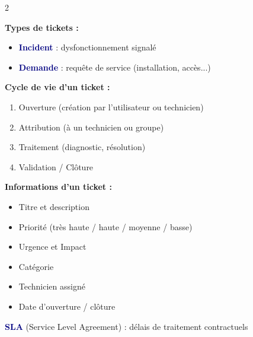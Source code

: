 \documentclass[a4paper,10pt]{article}
\newcommand{\key}[1]{\textbf{\textcolor{navy}{#1}}}
\begin{document}
\begin{multicols}{2}
\begin{tcolorbox}[basebox, colframe=teal, title=3. GLPI — Gestion des tickets]
\textbf{Types de tickets :}
\begin{itemize}
  \item \key{Incident} : dysfonctionnement signalé
  \item \key{Demande} : requête de service (installation, accès...)
\end{itemize}
\vspace{4pt}
\textbf{Cycle de vie d'un ticket :}
\begin{enumerate}
  \item Ouverture (création par l'utilisateur ou technicien)
  \item Attribution (à un technicien ou groupe)
  \item Traitement (diagnostic, résolution)
  \item Validation / Clôture
\end{enumerate}
\vspace{4pt}
\textbf{Informations d'un ticket :}
\begin{itemize}
  \item Titre et description
  \item Priorité (très haute / haute / moyenne / basse)
  \item Urgence et Impact
  \item Catégorie
  \item Technicien assigné
  \item Date d'ouverture / clôture
\end{itemize}
\vspace{4pt}
\key{SLA} (Service Level Agreement) : délais de traitement contractuels
\end{tcolorbox}


\end{multicols}
\end{document}
